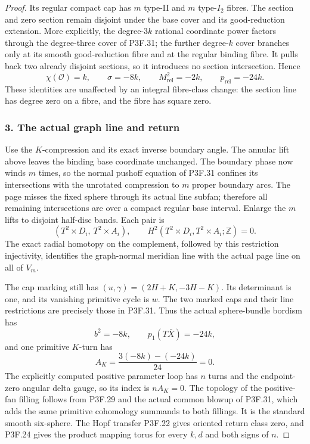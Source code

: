 \begin{proof}
Its regular compact cap has \(m\) type-II and \(m\) type-\(I_2\) fibres. The section and zero section remain disjoint under the base cover and its good-reduction extension. More explicitly, the degree-\(3k\) rational coordinate power factors through the degree-three cover of P3F.31; the further degree-\(k\) cover branches only at its smooth good-reduction fibre and at the regular binding fibre. It pulls back two already disjoint sections, so it introduces no section intersection. Hence \[
 \chi(\mathcal O)=k,\qquad \sigma=-8k,\qquad
 M_{\mathrm{rel}}^2=-2k,\qquad p_{\mathrm{rel}}=-24k.
\] These identities are unaffected by an integral fibre-class change: the section line has degree zero on a fibre, and the fibre has square zero.

\subsubsection{3. The actual graph line and return}\label{the-actual-graph-line-and-return}

Use the \(K\)-compression and its exact inverse boundary angle. The annular lift above leaves the binding base coordinate unchanged. The boundary phase now winds \(m\) times, so the normal pushoff equation of P3F.31 confines its intersections with the unrotated compression to \(m\) proper boundary arcs. The page misses the fixed sphere through its actual line subfan; therefore all remaining intersections are over a compact regular base interval. Enlarge the \(m\) lifts to disjoint half-disc bands. Each pair is \[
 (T^2\times D_i,\ T^2\times A_i),
 \qquad H^2(T^2\times D_i,T^2\times A_i;\mathbb Z)=0.
\] The exact radial homotopy on the complement, followed by this restriction injectivity, identifies the graph-normal meridian line with the actual page line on all of \(V_m\).

The cap marking still has \((u,\gamma)=(2H+K,-3H-K)\). Its determinant is one, and its vanishing primitive cycle is \(w\). The two marked caps and their line restrictions are precisely those in P3F.31. Thus the actual sphere-bundle bordism has \[
 b^2=-8k,\qquad p_1(T\bar X)=-24k,
\] and one primitive \(K\)-turn has \[
 A_K=\frac{3(-8k)-(-24k)}{24}=0.
\] The explicitly computed positive parameter loop has \(n\) turns and the endpoint-zero angular delta gauge, so its index is \(nA_K=0\). The topology of the positive-fan filling follows from P3F.29 and the actual common blowup of P3F.31, which adds the same primitive cohomology summands to both fillings. It is the standard smooth six-sphere. The Hopf transfer P3F.22 gives oriented return class zero, and P3F.24 gives the product mapping torus for every \(k,d\) and both signs of \(n\).
\end{proof}
